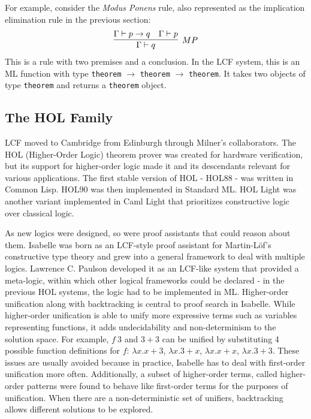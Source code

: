 \documentclass{article}
\begin{document}
	For example, consider the 
	\textit{Modus Ponens} rule, also 
	represented as the 
	implication	elimination rule in 
	the previous section:
	\begin{align*}
		\infer[MP]{\Gamma \vdash q}
		{\Gamma \vdash p \to q & \Gamma \vdash p}
	\end{align*}
	This is a rule with two premises and a 
	conclusion. In the LCF system, this is an
	ML function with type
	\texttt{theorem} $\to$ \texttt{theorem}
	$\to$ \texttt{theorem}. It takes 
	two objects of type \texttt{theorem}
	and returns a \texttt{theorem} object.
	
	\subsection{The HOL Family}
	LCF moved to Cambridge from Edinburgh
	through Milner's collaborators. The 
	HOL (Higher-Order Logic) theorem 
	prover was created for hardware 
	verification, but its support for 
	higher-order logic made it and 
	its descendants relevant for 
	various applications. The first 
	stable version of HOL - HOL88 - was
	written in Common Lisp. HOL90 was 
	then implemented in Standard ML. 
	HOL Light was another variant 
	implemented in Caml Light that 
	prioritizes constructive logic 
	over classical logic. 
	
	As new logics
	were designed, so were proof 
	assistants that could reason about 
	them. Isabelle was born as an 
	LCF-style proof assistant for 
	Martin-L\"{o}f's constructive type 
	theory and grew into a general 
	framework to deal with multiple 
	logics. Lawrence C. Paulson 
	developed it as an LCF-like
	system that provided a meta-logic, 
	within which other logical frameworks 
	could be declared - in the previous 
	HOL systems, the logic had to be 
	implemented in ML. Higher-order
	unification along with backtracking
	is central to proof search in Isabelle. 
	While higher-order unification 
	is able to unify more expressive 
	terms such as variables 
	representing functions, it adds 
	undecidability and non-determinism 
	to the solution space. For example, 
	$f\ 3$ and $3+3$ can be unified 
	by substituting 4 possible function 
	definitions for $f$: 
	$\lambda x.x+3$, $\lambda x.3+x$, 
	$\lambda x.x+x$, $\lambda x.3+3$.
	These issues are usually avoided 
	because in practice, Isabelle 
	has to deal with first-order 
	unification more often. Additionally, 
	a subset of higher-order terms, 
	called higher-order patterns were 
	found to behave like first-order 
	terms for the purposes of unification.
	When there are a non-deterministic 
	set of unifiers, backtracking allows
	different solutions to be explored.
	
\end{document}
